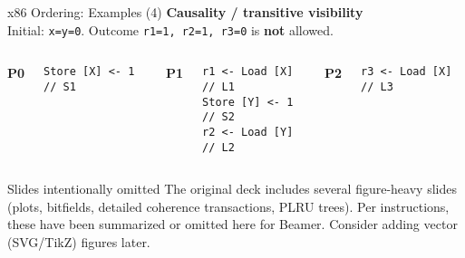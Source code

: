 \documentclass[aspectratio=169,12pt]{beamer}
\begin{document}
\begin{frame}[fragile]{x86 Ordering: Examples (4)}
\textbf{Causality / transitive visibility}\\[3pt]
Initial: \texttt{x=y=0}. Outcome \texttt{r1=1, r2=1, r3=0} is \textbf{not} allowed.
\begin{columns}[T]
\textbf{P0}
\begin{lstlisting}[basicstyle=\ttfamily\small]
Store [X] <- 1   // S1
\end{lstlisting}
\textbf{P1}
\begin{lstlisting}[basicstyle=\ttfamily\small]
r1 <- Load [X]   // L1
Store [Y] <- 1   // S2
r2 <- Load [Y]   // L2
\end{lstlisting}
\textbf{P2}
\begin{lstlisting}[basicstyle=\ttfamily\small]
r3 <- Load [X]   // L3
\end{lstlisting}
\end{columns}
\end{frame}

\begin{frame}{Slides intentionally omitted}
The original deck includes several figure-heavy slides (plots, bitfields, detailed
coherence transactions, PLRU trees). Per instructions, these have been summarized
or omitted here for Beamer. Consider adding vector (SVG/TikZ) figures later.
\end{frame}
\end{document}
